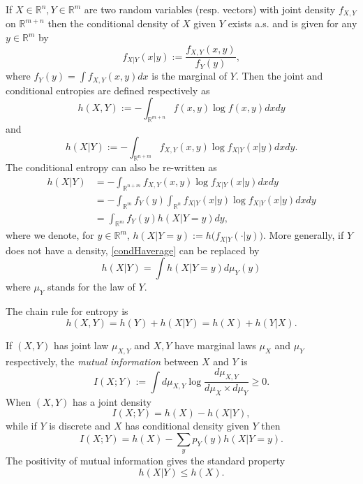 \documentclass{article}
\theoremstyle{plain}
\theoremstyle{definition}
\newcommand{\RL}{\mathbb{R}}
\newcommand{\1}{\mathbf 1}
\begin{document}
If $X \in \mathbb{R}^n,Y \in \mathbb{R}^m$ are two random variables (resp. vectors) with joint density $f_{X,Y}$ on $\mathbb{R}^{m+n}$ then the conditional density of $X$ given $Y$ exists a.s. and is given for any $y \in \mathbb{R}^m$ by 
$$
f_{X|Y}(x|y) := \frac{f_{X,Y}(x,y)}{f_Y(y)},
$$
where $f_Y(y) = \int{f_{X,Y}(x,y) dx}$ is the marginal of $Y$.
Then the joint and conditional entropies are defined respectively as 
$$
h(X,Y) := -\int_{\RL^{m+n}}{f(x,y)\log{f(x,y)}dxdy}
$$
and
$$
h(X|Y) := -\int_{\RL^{n+m}}{f_{X,Y}(x,y)\log{f_{X|Y}(x|y)}dxdy}.
$$
The conditional entropy can also be re-written as 
\begin{align} \nonumber
h(X|Y) &= -\int_{\RL^{n+m}}{f_{X,Y}(x,y)\log{f_{X|Y}(x|y)}dxdy} \\ \label{condHexpression}
&= -\int_{\RL^{m}} {f_Y(y)\int_{\RL^n}{f_{X|Y}(x|y)\log{f_{X|Y}(x|y)}dx}dy} \\ \label{condHaverage}
&= \int_{\RL^m}{f_Y(y)h(X|Y=y)}dy, 
\end{align}
where we denote, for $y \in \RL^m$, $h(X|Y=y) := h\bigl(f_{X|Y}(\cdot|y)\bigr).$ More generally, if $Y$ does not have a density, \eqref{condHaverage} can be replaced by 
\begin{equation} 
h(X|Y) = \int{h(X|Y=y) d\mu_Y(y)}
\end{equation}
where $\mu_Y$ stands for the law of $Y$.

The chain rule for entropy \cite{cover:book} is 
\begin{equation} \label{chainrule}
h(X,Y) = h(Y) + h(X|Y) = h(X) + h(Y|X).
\end{equation}

If $(X,Y)$ has joint law $\mu_{X,Y}$ and $X,Y$ have marginal laws $\mu_X$ and $\mu_Y$ respectively, the {\em mutual information} between $X$ and $Y$ is 
\begin{equation} \label{mutualinfodef}
I(X;Y) := \int d\mu_{X,Y}\log{\frac{d\mu_{X,Y}}{d\mu_X \times d\mu_Y}} \geq 0.
\end{equation}
When $(X,Y)$ has a joint density
$$
I(X;Y) = h(X) - h(X|Y),
$$
while if $Y$ is discrete and $X$ has conditional density given $Y$ then 
$$
I(X;Y) = h(X) - \sum_yp_Y(y)h(X|Y=y).
$$
The positivity of mutual information gives the standard property 
\begin{equation} \label{conditionreduceentropy}
    h(X|Y) \leq h(X).
\end{equation}









\end{document}
